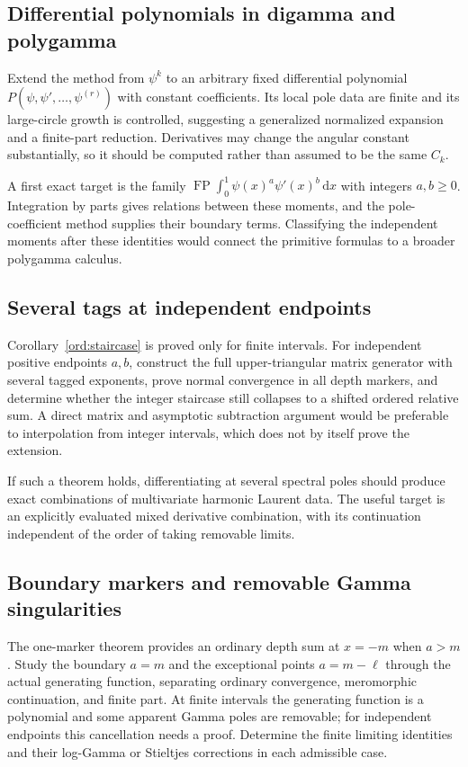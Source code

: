\documentclass[11pt,a4paper]{article}
\numberwithin{equation}{section}
\theoremstyle{definition}
\theoremstyle{remark}
\DeclareMathOperator{\FP}{FP}
\newcommand{\dd}{\mathrm d}
\begin{document}
\subsection{Differential polynomials in digamma and polygamma}

Extend the method from $\psi^k$ to an arbitrary fixed differential
polynomial
$P(\psi,\psi',\ldots,\psi^{(r)})$ with constant coefficients.
Its local pole data are finite and its large-circle growth is
controlled, suggesting a generalized normalized expansion and a
finite-part reduction.  Derivatives may change the angular
constant substantially, so it should be computed rather than
assumed to be the same $C_k$.

A first exact target is the family
$\FP\int_0^1\psi(x)^a\psi'(x)^b\,\dd x$ with integers
$a,b\ge0$.  Integration by parts gives relations between these
moments, and the pole-coefficient method supplies their boundary
terms.  Classifying the independent moments after these identities
would connect the primitive formulas to a broader polygamma calculus.

\subsection{Several tags at independent endpoints}

Corollary~\ref{ord:staircase} is proved only for finite intervals.
For independent positive endpoints $a,b$, construct the full
upper-triangular matrix generator with several tagged exponents,
prove normal convergence in all depth markers, and determine
whether the integer staircase still collapses to a shifted ordered
relative sum.  A direct matrix and asymptotic subtraction argument
would be preferable to interpolation from integer intervals, which
does not by itself prove the extension.

If such a theorem holds, differentiating at several spectral poles
should produce exact combinations of multivariate harmonic Laurent
data.  The useful target is an explicitly evaluated mixed derivative
combination, with its continuation independent of the order of
taking removable limits.

\subsection{Boundary markers and removable Gamma singularities}

The one-marker theorem provides an ordinary depth sum at $x=-m$
when $a>m$.  Study the boundary $a=m$ and the exceptional points
$a=m-\ell$ through the actual generating function, separating
ordinary convergence, meromorphic continuation, and finite part.
At finite intervals the generating function is a polynomial and
some apparent Gamma poles are removable; for independent endpoints
this cancellation needs a proof.  Determine the finite limiting
identities and their log-Gamma or Stieltjes corrections in each
admissible case.
\end{document}
